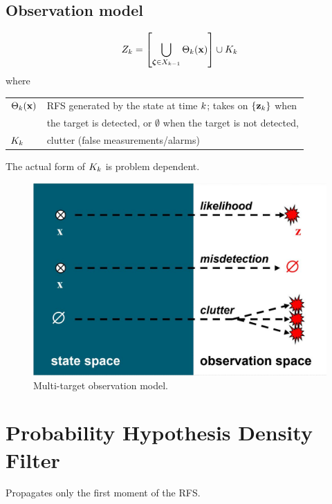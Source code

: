 \documentclass[a4paper,10pt]{scrreprt}
\theoremstyle{theorem}
\theoremstyle{definition}
\begin{document}
\subsection{Observation model}
\begin{equation}\label{eq:multitarget_observation}
	\msRFS_\tind = \bqty{ \bigcup_{\vb{\zeta} \in \stRFS_{\tind-1}} \Theta_{\tind}(\inVar) } \cup K_\tind
\end{equation}
where
\begin{table}[h]
	\centering
	\begin{tabular}{@{} l l @{}}
		\toprule
		\( \Theta_{\tind}(\inVar) \)	& RFS generated by the state at time $ k $; takes on \( \Bqty{\msVar_\tind} \) when \\ 
										& the target is detected, or \( \emptyset \) when the target is not detected, \\
		\( K_k \)					& clutter (false measurements/alarms) \\
		\bottomrule
	\end{tabular}
\end{table}
The actual form of \( K_k \) is problem dependent.
\begin{figure}[h]
	\centering
	\includegraphics[scale=0.22]{./img/multi-target_observation_model}
	\caption{Multi-target observation model.}
\end{figure}




\section{Probability Hypothesis Density Filter}
Propagates only the first moment of the RFS.
\end{document}
